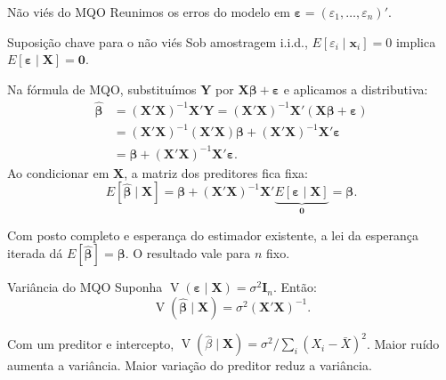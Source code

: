 \documentclass[
  ignorenonframetext,
  brazilian,
  aspectratio=169,
  10pt]{beamer}
\begin{document}
\begin{frame}{Não viés do MQO}
\protect{}\label{nuxe3o-viuxe9s-do-mqo}
Reunimos os erros do modelo em
\(\boldsymbol\varepsilon=(\varepsilon_1,\ldots,\varepsilon_n)'\).

\begin{block}{Suposição chave para o não viés}
Sob amostragem i.i.d., $E[\varepsilon_i\mid\mathbf x_i]=0$ implica
$\boxed{E[\boldsymbol\varepsilon\mid\mathbf X]=\mathbf 0.}$
\end{block}

Na fórmula de MQO, substituímos \(\mathbf Y\) por
\(\mathbf X\boldsymbol\beta+\boldsymbol\varepsilon\) e aplicamos a
distributiva: \[
\begin{aligned}
\widehat{\boldsymbol\beta}
&=(\mathbf X'\mathbf X)^{-1}\mathbf X'\mathbf Y
=(\mathbf X'\mathbf X)^{-1}\mathbf X'(\mathbf X\boldsymbol\beta+\boldsymbol\varepsilon)\\
&=(\mathbf X'\mathbf X)^{-1}(\mathbf X'\mathbf X)\boldsymbol\beta
+(\mathbf X'\mathbf X)^{-1}\mathbf X'\boldsymbol\varepsilon\\
&=\boldsymbol\beta+(\mathbf X'\mathbf X)^{-1}\mathbf X'\boldsymbol\varepsilon.
\end{aligned}
\] Ao condicionar em \(\mathbf X\), a matriz dos preditores fica fixa:
\[
E[\widehat{\boldsymbol\beta}\mid\mathbf X]
=\boldsymbol\beta+(\mathbf X'\mathbf X)^{-1}\mathbf X'
\underbrace{E[\boldsymbol\varepsilon\mid\mathbf X]}_{\mathbf 0}
=\boldsymbol\beta.
\]

\small

Com posto completo e esperança do estimador existente, a lei da
esperança iterada dá \(E[\widehat{\boldsymbol\beta}]=\boldsymbol\beta\).
O resultado vale para \(n\) fixo.
\end{frame}

\begin{frame}{Variância do MQO}
\protect{}\label{variuxe2ncia-do-mqo}
Suponha
\(\operatorname{V}(\boldsymbol\varepsilon\mid\mathbf X)=\sigma^2\mathbf I_n\).
Então: \[
\boxed{\operatorname{V}(\widehat{\boldsymbol\beta}\mid\mathbf X)
=\sigma^2(\mathbf X'\mathbf X)^{-1}.}
\]

\small

Com um preditor e intercepto,
\(\operatorname{V}(\widehat\beta\mid\mathbf X)=
\sigma^2/\sum_i(X_i-\bar X)^2\). Maior ruído aumenta a variância. Maior
variação do preditor reduz a variância.
\end{frame}
\end{document}

